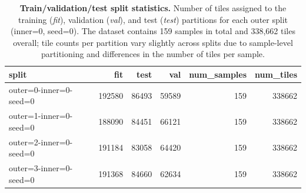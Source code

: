 \begin{table}
\centering
\caption{\textbf{Train/validation/test split statistics.} Number of tiles assigned to the training (\textit{fit}), validation (\textit{val}), and test (\textit{test}) partitions for each outer split (inner=0, seed=0). The dataset contains 159 samples in total and 338{,}662 tiles overall; tile counts per partition vary slightly across splits due to sample-level partitioning and differences in the number of tiles per sample.}
\label{tab:p-fus:cohort}
    \begin{tabular}{lrrrrr}
  \toprule
  split & fit & test & val & num\_samples & num\_tiles \\
  \midrule
  outer=0-inner=0-seed=0 & 192580 & 86493 & 59589 & 159 & 338662 \\
  outer=1-inner=0-seed=0 & 188090 & 84451 & 66121 & 159 & 338662 \\
  outer=2-inner=0-seed=0 & 191184 & 83058 & 64420 & 159 & 338662 \\
  outer=3-inner=0-seed=0 & 191368 & 84660 & 62634 & 159 & 338662 \\
  \bottomrule
\end{tabular}
\end{table}

